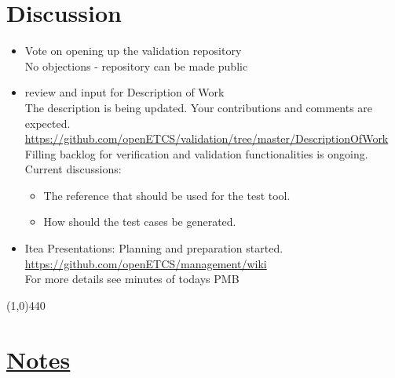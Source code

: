 \documentclass[a4paper, 11pt]{article}
\begin{document}
\section{Discussion}
\begin{itemize}
\item Vote on opening up the validation repository\\
No objections - repository can be made public

\item review and input for Description of Work\\
The description is being updated. Your contributions and comments are expected.\\
\url{https://github.com/openETCS/validation/tree/master/DescriptionOfWork}\\

Filling backlog for verification and validation functionalities is ongoing. Current discussions:
\begin{itemize}
\item The reference that should be used for the test tool.
\item How should the test cases be generated.
\end{itemize}

\item Itea Presentations: Planning and preparation started.\\
\url{https://github.com/openETCS/management/wiki}\\
For more details see minutes of todays PMB\

\end{itemize}

\line(1,0){440}
\section{\underline{Notes}}
\end{document}
